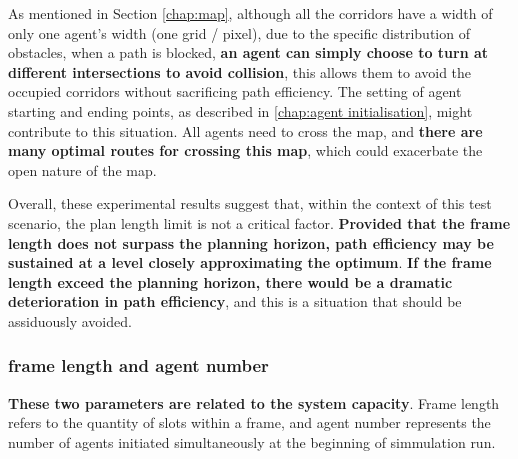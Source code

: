As mentioned in Section \ref{chap:map}, although all the corridors have a width of only one agent's width (one grid / pixel), due to the specific distribution of obstacles, 
when a path is blocked, \textbf{an agent can simply choose to turn at different intersections to avoid collision}, 
this allows them to avoid the occupied corridors without sacrificing path efficiency.
The setting of agent starting and ending points, as described in \ref{chap:agent initialisation}, might contribute to this situation. 
All agents need to cross the map, and \textbf{there are many optimal routes for crossing this map}, which could exacerbate the open nature of the map.

Overall, these experimental results suggest that, within the context of this test scenario, 
the plan length limit is not a critical factor. 
\textbf{Provided that the frame length does not surpass the planning horizon, path efficiency may be sustained at a level closely approximating the optimum}. 
\textbf{If the frame length exceed the planning horizon, there would be a dramatic deterioration in path efficiency}, and this is a situation that should be assiduously avoided.

\subsubsection{frame length and agent number}

\textbf{These two parameters are related to the system capacity}. Frame length refers to the quantity of slots within a frame, and agent number represents the number of agents initiated simultaneously at the beginning of simmulation run.

